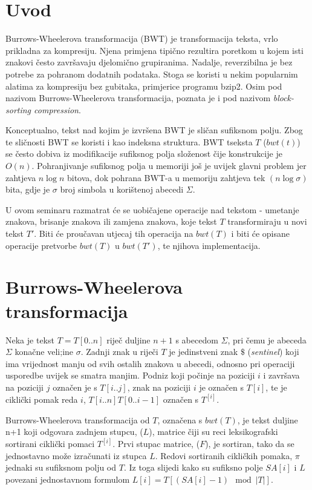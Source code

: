\documentclass{ferseminar}
\begin{document}
\stvoripredstranice
\section{Uvod}
Burrows-Wheelerova transformacija (BWT) je transformacija teksta, vrlo prikladna za kompresiju. Njena primjena tipično rezultira poretkom u kojem isti znakovi često završavaju djelomično grupiranima. Nadalje, reverzibilna je bez potrebe za pohranom dodatnih podataka. Stoga se koristi u nekim popularnim alatima za kompresiju bez gubitaka, primjerice programu bzip2.  Osim pod nazivom Burrows-Wheelerova transformacija, poznata je i pod nazivom \textit{block-sorting compression}. 


Konceptualno, tekst nad kojim je izvršena BWT je sličan sufiksnom polju. Zbog te sličnosti BWT se koristi i kao indeksna struktura. BWT tseksta $T$ ($bwt(t)$) se često dobiva iz modifikacije sufiksnog polja složenost čije konstrukcije je $O(n)$. Pohranjivanje sufiksnog polja u memoriji još je uvijek glavni problem jer zahtjeva $n\log{}n$ bitova, dok pohrana BWT-a u memoriju zahtjeva tek $(n\log{}\sigma)$ bita, gdje je $\sigma$ broj simbola u korištenoj abecedi $\Sigma$.


U ovom seminaru razmatrat će se uobičajene operacije nad tekstom - umetanje znakova, brisanje znakova ili zamjena znakova, koje tekst $T$ transformiraju u novi tekst $T'$. Biti će proučavan utjecaj tih operacija na $bwt(T)$ i biti će opisane operacije pretvorbe $bwt(T)$ u $bwt(T')$, te njihova implementacija.

\section{Burrows-Wheelerova transformacija}

Neka je tekst $T=T[0..n]$ riječ duljine $n+1$ s abecedom $\Sigma$, pri čemu je abeceda $\Sigma$ konačne veli;ine $\sigma$. Zadnji znak u riječi $T$ je jedinstveni znak $\$$ (\textit{sentinel}) koji ima vrijednost manju od svih ostalih znakova u abecedi, odnosno pri operaciji usporedbe uvijek se smatra manjim.  Podniz koji počinje na poziciji $i$ i završava na poziciji $j$ označen je s $T[i..j]$, znak na poziciji $i$ je označen s $T[i]$, te je ciklički pomak reda $i$,  $T[i..n]T[0..i-1]$ označen s $T^{[i]}$.

Burrows-Wheelerova transformacija od $T$, označena s $bwt(T)$, je tekst duljine n+1 koji odgovara zadnjem stupcu, ($L$), matrice čiji su reci leksikografski sortirani ciklički pomaci $T^{[i]}$. Prvi stupac matrice, ($F$), je sortiran, tako da se jednostavno može izračunati iz stupca $L$. Redovi sortiranih cikličkih pomaka, $\pi$ jednaki su sufiksnom polju od $T$. Iz toga slijedi kako su sufiksno polje $SA[i]$ i $L$ povezani jednostavnom formulom $L[i]= T[(SA[i]-1) \mod |T|]$.
\end{document}
